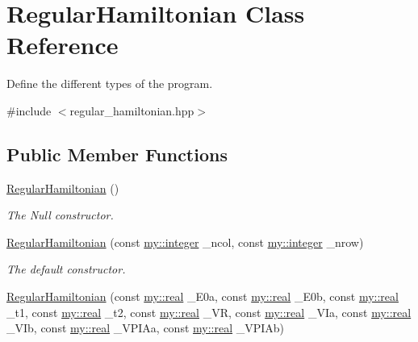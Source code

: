 \hypertarget{classRegularHamiltonian}{}\section{Regular\+Hamiltonian Class Reference}
\label{classRegularHamiltonian}


Define the different types of the program.  




{\ttfamily \#include $<$regular\+\_\+hamiltonian.\+hpp$>$}

\subsection*{Public Member Functions}
\begin{DoxyCompactItemize}
\item 
\hyperlink{classRegularHamiltonian_a334e4a636fad634fd36921c045611c1d}{Regular\+Hamiltonian} ()
\begin{DoxyCompactList}\small\item\em The Null constructor. \end{DoxyCompactList}\item 
\hyperlink{classRegularHamiltonian_a043c6a42682d1cac7a4505e91b2bff79}{Regular\+Hamiltonian} (const \hyperlink{namespacemy_a42365393c537edae1e89d20ff90d1923}{my\+::integer} \+\_\+ncol, const \hyperlink{namespacemy_a42365393c537edae1e89d20ff90d1923}{my\+::integer} \+\_\+nrow)
\begin{DoxyCompactList}\small\item\em The default constructor. \end{DoxyCompactList}\item 
\hyperlink{classRegularHamiltonian_a357f235a1c4c69e2370e59b4aad35eea}{Regular\+Hamiltonian} (const \hyperlink{namespacemy_ad61baeaeda728a4c48dd64f93e44a46c}{my\+::real} \+\_\+\+E0a, const \hyperlink{namespacemy_ad61baeaeda728a4c48dd64f93e44a46c}{my\+::real} \+\_\+\+E0b, const \hyperlink{namespacemy_ad61baeaeda728a4c48dd64f93e44a46c}{my\+::real} \+\_\+t1, const \hyperlink{namespacemy_ad61baeaeda728a4c48dd64f93e44a46c}{my\+::real} \+\_\+t2, const \hyperlink{namespacemy_ad61baeaeda728a4c48dd64f93e44a46c}{my\+::real} \+\_\+\+VR, const \hyperlink{namespacemy_ad61baeaeda728a4c48dd64f93e44a46c}{my\+::real} \+\_\+\+V\+Ia, const \hyperlink{namespacemy_ad61baeaeda728a4c48dd64f93e44a46c}{my\+::real} \+\_\+\+V\+Ib, const \hyperlink{namespacemy_ad61baeaeda728a4c48dd64f93e44a46c}{my\+::real} \+\_\+\+V\+P\+I\+Aa, const \hyperlink{namespacemy_ad61baeaeda728a4c48dd64f93e44a46c}{my\+::real} \+\_\+\+V\+P\+I\+Ab)

\end{DoxyCompactItemize}
